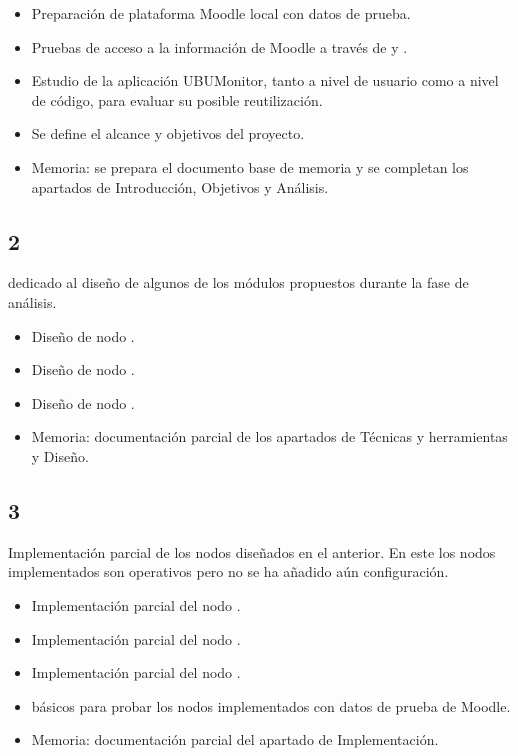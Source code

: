 \begin{itemize}
	\item Preparación de plataforma Moodle local con datos de prueba. 
	\item Pruebas de acceso a la información de Moodle a través de  y . 
    \item Estudio de la aplicación UBUMonitor, tanto a nivel de usuario como a nivel de código, para evaluar su posible reutilización.
    \item Se define el alcance y objetivos del proyecto.
    \item Memoria: se prepara el documento base de memoria y se completan los apartados de Introducción, Objetivos y Análisis. 
\end{itemize}


\subsection{ 2}

 dedicado al diseño de algunos de los módulos propuestos durante la fase de análisis. 

\begin{itemize}
	\item Diseño de nodo .
	\item Diseño de nodo .
	\item Diseño de nodo .
	\item Memoria: documentación parcial de los apartados de Técnicas y herramientas y Diseño.
\end{itemize}


\subsection{ 3}

Implementación parcial de los nodos diseñados en el  anterior. En este  los nodos implementados son operativos 
pero no se ha añadido aún configuración. 

\begin{itemize}
	\item Implementación parcial del nodo .
	\item Implementación parcial del nodo .
	\item Implementación parcial del nodo .
	\item {} básicos para probar los nodos implementados con datos de prueba de Moodle. 
	\item Memoria: documentación parcial del apartado de Implementación.
\end{itemize}


